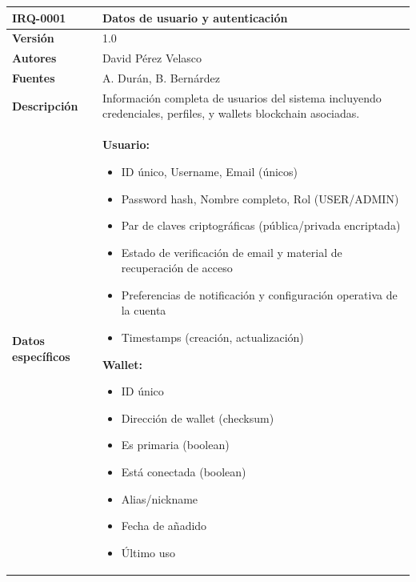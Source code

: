 \documentclass[11pt, a4paper]{article}
\begin{document}
\begin{table}[H]
    \centering
    \small
    \begin{tabular}{|p{4cm}|p{10cm}|}
    \hline
    \textbf{IRQ-0001} & Datos de usuario y autenticación \\
    \hline
    \textbf{Versión} & 1.0 \\
    \hline
    \textbf{Autores} & David Pérez Velasco \\
    \hline
    \textbf{Fuentes} & A. Durán, B. Bernárdez \\
    \hline
    \textbf{Descripción} & Información completa de usuarios del sistema incluyendo credenciales, perfiles, y wallets blockchain asociadas. \\
    \hline
    \textbf{Datos específicos} & 
    \textbf{Usuario:}
    \begin{itemize}
        \item ID único, Username, Email (únicos)
        \item Password hash, Nombre completo, Rol (USER/ADMIN)
        \item Par de claves criptográficas (pública/privada encriptada)
        \item Estado de verificación de email y material de recuperación de acceso
        \item Preferencias de notificación y configuración operativa de la cuenta
        \item Timestamps (creación, actualización)
    \end{itemize}
    
    \textbf{Wallet:}
    \begin{itemize}
        \item ID único
        \item Dirección de wallet (checksum)
        \item Es primaria (boolean)
        \item Está conectada (boolean)
        \item Alias/nickname
        \item Fecha de añadido
        \item Último uso
    \end{itemize}
    

\end{tabular}
\end{table}
\end{document}
